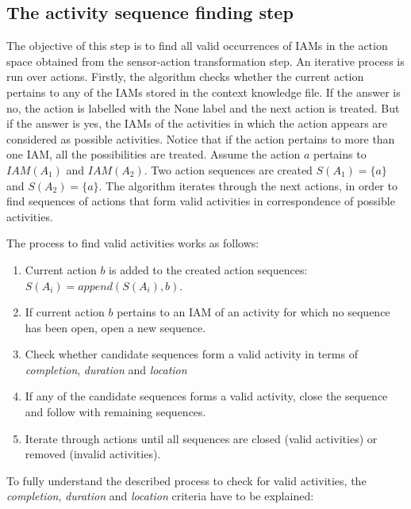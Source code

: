 \subsection{The activity sequence finding step}
\label{subsec:clustering:sa3:find}

The objective of this step is to find all valid occurrences of IAMs in the action space obtained from the sensor-action transformation step. An iterative process is run over actions. Firstly, the algorithm checks whether the current action pertains to any of the IAMs stored in the context knowledge file. If the answer is no, the action is labelled with the None label and the next action is treated. But if the answer is yes, the IAMs of the activities in which the action appears are considered as possible activities. Notice that if the action pertains to more than one IAM, all the possibilities are treated. Assume the action $a$ pertains to $IAM(A_1)$ and $IAM(A_2)$. Two action sequences are created $S(A_1) = \{a\}$ and $S(A_2) = \{a\}$. The algorithm iterates through the next actions, in order to find sequences of actions that form valid activities in correspondence of possible activities.

The process to find valid activities works as follows:

\begin{enumerate}
 \item Current action $b$ is added to the created action sequences: $S(A_i) = append(S(A_i), b)$.
 \item If current action $b$ pertains to an IAM of an activity for which no sequence has been open, open a new sequence.
 \item Check whether candidate sequences form a valid activity in terms of \textit{completion}, \textit{duration} and \textit{location}
 \item If any of the candidate sequences forms a valid activity, close the sequence and follow with remaining sequences.
 \item Iterate through actions until all sequences are closed (valid activities) or removed (invalid activities).
\end{enumerate}

To fully understand the described process to check for valid activities, the \textit{completion}, \textit{duration} and \textit{location} criteria have to be explained:

